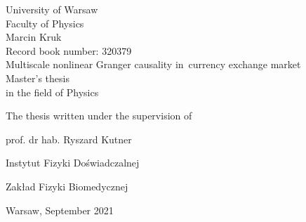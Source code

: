 \thispagestyle{empty}
\vspace*{2cm}
\begin{center}
{\huge University of Warsaw\\ \vspace{0.3cm}
Faculty of Physics}\\
\vspace{1.5cm}
Marcin Kruk\\
Record book number: 320379\\
\vspace{1.5cm}
{\huge Multiscale nonlinear Granger causality \mbox{in currency} exchange market}\\
\vspace{2cm}
Master's thesis\\
in the field of Physics
\end{center}
\vspace{3cm}
\hfill The thesis written under the supervision of\vspace{0.2cm}

\hfill prof. dr hab. Ryszard Kutner

\hfill Instytut Fizyki Doświadczalnej

\hfill Zakład Fizyki Biomedycznej
\vfill
\begin{center}
{\large Warsaw, September 2021}\\
\end{center}
